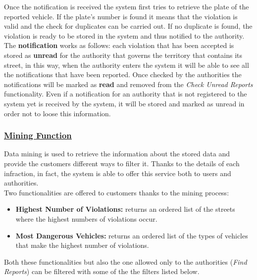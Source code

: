 		Once the notification is received the system first tries to retrieve the plate of the reported vehicle. If the plate's number is found it means that the violation is valid and the check for duplicates can be carried out. If no duplicate is found, the violation is ready to be stored in the system and thus notified to the authority. The \textbf{notification} works as follows: each violation that has been accepted is stored as \textbf{unread} for the authority that governs the territory that contains its street, in this way, when the authority enters the system it will be able to see all the notifications that have been reported. Once checked by the authorities the notifications will be marked as \textbf{read} and removed from the \emph{Check Unread Reports} functionality. Even if a notification for an authority that is not registered to the system yet is received by the system, it will be stored and marked as unread in order not to loose this information.

	\subsubsection[Statistics Function]{\hyperlink{toc}{Mining Function}}
		Data mining is used to retrieve the information about the stored data and provide the customers different ways to filter it. Thanks to the details of each infraction, in fact, the system is able to offer this service both to users and authorities. \\
		
		Two functionalities are offered to customers thanks to the mining process: 
		
		\begin{itemize}
			\item \textbf{Highest Number of Violations:} returns an ordered list of the streets where the highest numbers of violations occur.
			\item \textbf{Most Dangerous Vehicles:} returns an ordered list of the types of vehicles that make the highest number of violations.
		\end{itemize}
		
		 Both these functionalities but also the one allowed only to the authorities (\emph{Find Reports}) can be filtered with some of the the filters listed below.
			
